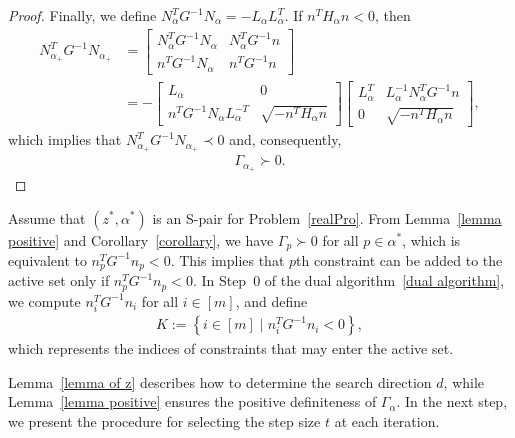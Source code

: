 \documentclass{article}
\begin{document}
\begin{proof}
		Finally, we define $N_{\alpha}^{T}G^{-1}N_{\alpha} = -L_{\alpha}L_{\alpha}^{T}$.
		If $n^{T}H_{\alpha}n < 0$, then
		\begin{align*}
			N_{\alpha_{+}}^{T}G^{-1}N_{\alpha_{+}}
			&=
			\begin{bmatrix}
				N_{\alpha}^{T}G^{-1}N_{\alpha} & N_{\alpha}^{T}G^{-1}n\\
				n^{T}G^{-1}N_{\alpha} & n^{T}G^{-1}n
			\end{bmatrix}\\
			&=
			-\begin{bmatrix}
				L_{\alpha} & 0\\
				n^{T}G^{-1}N_{\alpha}L_{\alpha}^{-T} & \sqrt{-n^{T}H_{\alpha}n}
			\end{bmatrix}
			\begin{bmatrix}
				L_{\alpha}^{T} & L_{\alpha}^{-1}N_{\alpha}^{T}G^{-1}n\\
				0 & \sqrt{-n^{T}H_{\alpha}n}
			\end{bmatrix},
		\end{align*}
		which implies that $N_{\alpha_{+}}^{T}G^{-1}N_{\alpha_{+}} \prec 0$ and, consequently,
		\begin{align*}
		\Gamma_{\alpha_{+}} \succ 0.
		\end{align*}
	\end{proof}
	
	Assume that $(z^{\ast}, \alpha^{\ast})$ is an S-pair for Problem~\eqref{realPro}.
	From Lemma~\ref{lemma positive} and Corollary~\ref{corollary}, we have
	$\Gamma_{p} \succ 0$ for all $p \in \alpha^{\ast}$, which is equivalent to
	$n_{p}^{T}G^{-1}n_{p} < 0$.
	This implies that $p$th constraint can be added to the active set only if
	$n_{p}^{T}G^{-1}n_{p} < 0$.
	In Step~0 of the dual algorithm~\ref{dual algorithm}, we compute
	$n_{i}^{T}G^{-1}n_{i}$ for all $i \in [m]$, and define
	\begin{align}
	K := \left\lbrace i \in [m] \mid n_{i}^{T}G^{-1}n_{i} < 0 \right\rbrace,
	\end{align}
	which represents the indices of constraints that may enter the active set.
	
	Lemma~\ref{lemma of z} describes how to determine the search direction $d$,
	while Lemma~\ref{lemma positive} ensures the positive definiteness of
	$\Gamma_{\alpha}$. In the next step, we present the procedure for selecting the
	step size $t$ at each iteration.
	
\end{document}
